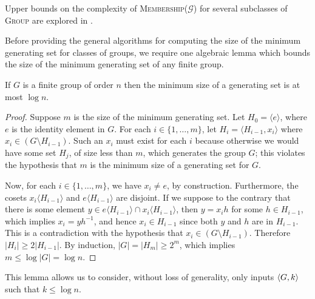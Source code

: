 \documentclass{article}
\newcommand{\gen}[1]{{\langle #1 \rangle}}
\newcommand{\pair}[2]{\left\langle #1, #2 \right\rangle}
\let\originalleft\left
\let\originalright\right
\renewcommand{\left}{\mathopen{}\mathclose\bgroup\originalleft}
\renewcommand{\right}{\aftergroup\egroup\originalright}
\let\originalGC\GC
\renewcommand{\GC}[2]{\originalGC\left(#1, #2\right)}
\begin{document}
Upper bounds on the complexity of \textsc{Membership($\mathcal{G}$)} for several subclasses of \textsc{Group} are explored in \cite{bklm01}.

Before providing the general algorithms for computing the size of the minimum generating set for classes of groups, we require one algebraic lemma which bounds the size of the minimum generating set of any finite group.

\begin{lemma}\label{lem:log}
  If $G$ is a finite group of order $n$ then the minimum size of a generating set is at most $\log n$.
\end{lemma}
\begin{proof}
  Suppose $m$ is the size of the minimum generating set.
  Let $H_0 = \gen{e}$, where $e$ is the identity element in $G$.
  For each $i \in \{1, \dotsc, m\}$, let $H_i = \gen{H_{i - 1}, x_i}$ where $x_i \in (G \setminus H_{i - 1})$.
  Such an $x_i$ must exist for each $i$ because otherwise we would have some set $H_j$, of size less than $m$, which generates the group $G$; this violates the hypothesis that $m$ is the minimum size of a generating set for $G$.

  Now, for each $i \in \{1, \dotsc, m\}$, we have $x_i \neq e$, by construction.
  Furthermore, the cosets $x_i \gen{H_{i - 1}}$ and $e \gen{H_{i - 1}}$ are disjoint.
  If we suppose to the contrary that there is some element $y \in e \gen{H_{i - 1}} \cap x_i \gen{H_{i - 1}}$, then $y = x_i h$ for some $h \in H_{i - 1}$, which implies $x_i = yh^{-1}$, and hence $x_i \in H_{i - 1}$ since both $y$ and $h$ are in $H_{i - 1}$.
  This is a contradiction with the hypothesis that $x_i \in (G \setminus H_{i - 1})$.
  Therefore $|H_i| \geq 2 |H_{i - 1}|$.
  By induction, $|G| = |H_m| \geq 2^m$, which implies $m \leq \log |G| = \log n$.
\end{proof}

This lemma allows us to consider, without loss of generality, only inputs $\pair{G}{k}$ such that $k \leq \log n$.
\end{document}
